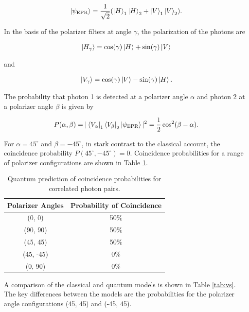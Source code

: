 \documentclass{article}
\begin{document}
\begin{equation}
  \ket{\psi_{\text{EPR}}} = \frac{1}{\sqrt{2}}(\ket{H}_1 \ket{H}_2 + \ket{V}_1 \ket{V}_2). \label{eq:epr}
\end{equation}

In the basis of the polarizer filters at angle $\gamma$, the  polarization of the photons are

\begin{equation}
  \ket{H_\gamma} = \cos(\gamma) \ket{H} + \sin(\gamma) \ket{V} \label{eq:h}
\end{equation}

and 

\begin{equation}
  \ket{V_\gamma} = \cos(\gamma) \ket{V} - \sin(\gamma) \ket{H}. \label{eq:v}
\end{equation}

The probability that photon 1 is detected at a polarizer angle $\alpha$ and photon 2 at a polarizer angle $\beta$ is given by

\begin{equation}
  P(\alpha, \beta) = |\bra{V_\alpha}_1\bra{V_\beta}_2 \ket{\psi_{\text{EPR}}}|^2 = \frac{1}{2} \cos^2(\beta-\alpha). \label{eq:quantum}
\end{equation}

For $\alpha = 45^{\circ}$ and $\beta = -45^{\circ}$, in stark contrast to the classical account, the coincidence probability $P(45^{\circ}, -45^{\circ}) = 0$. Coincidence probabilities for a range of polarizer configurations are shown in Table \ref{tab:quantum}.

\begin{table}[!h]
  \centering
  \begin{tabular}{ c c }
    Polarizer Angles & Probability of Coincidence \\ \hline
    (0, 0) & 50\% \\
    (90, 90) & 50\% \\
    (45, 45) & 50\% \\
    (45, -45) & 0\% \\
    (0, 90) & 0\%
  \end{tabular}
  \caption{Quantum prediction of coincidence probabilities for correlated photon pairs. \label{tab:quantum}}
\end{table}

A comparison of the classical and quantum models is shown in Table \ref{tab:vs}. The key differences between the models are the probabilities for the polarizer angle configurations (45, 45) and (-45, 45).
\end{document}
